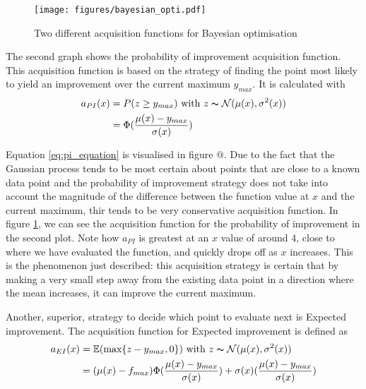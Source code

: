 \documentclass[a4paper,12pt,twoside,openright]{report}
\begin{document}
\begin{figure}
\centering
  \texttt{[image: figures/bayesian\_opti.pdf]}
  \caption{Two different acquisition functions for Bayesian optimisation}
  \label{bayesianopti}
\end{figure}

The second graph shows the probability of improvement acquisition function. This acquisition function is based on the strategy of finding the point most likely to yield an improvement over the current maximum $y_{max}$. It is calculated with
\begin{align}
a_{PI}(x) &= P(z \geq y_{max}) \text{\ with\ } z \thicksim \mathcal{N}(\mu(x),\sigma^2(x))\label{eq:pi_equation}\\
&=\Phi(\frac{\mu(x) - y_{max}}{\sigma(x)})
\end{align}

Equation \ref{eq:pi_equation} is visualised in figure @. Due to the fact that the Gaussian process tends to be most certain about points that are close to a known data point and the probability of improvement strategy does not take into account the magnitude of the difference between the function value at $x$ and the current maximum, thir tends to be very conservative acquisition function. In figure \ref{bayesianopti}, we can see the acquisition function for the probability of improvement in the second plot. Note how $a_{PI}$ is greatest at an $x$ value of around 4, close to where we have evaluated the function, and quickly drops off as $x$ increases. This is the phenomenon just described: this acquisition strategy is certain that by making a very small step away from the existing data point in a direction where the mean increases, it can improve the current maximum.

Another, superior, strategy to decide which point to evaluate next is Expected improvement. The acquisition function for Expected improvement is defined \cite{eipaper} as
\begin{align}
a_{EI}(x) &= \mathbb{E}(\text{max}\{z - y_{max}, 0\}) \text{\ with\ } z \thicksim \mathcal{N}(\mu(x),\sigma^2(x))\\
&= (\mu(x) - f_{max})\Phi(\frac{\mu(x) - y_{max}}{\sigma(x)}) + \sigma(x)(\frac{\mu(x) - y_{max}}{\sigma(x)})
\end{align}

\end{document}
